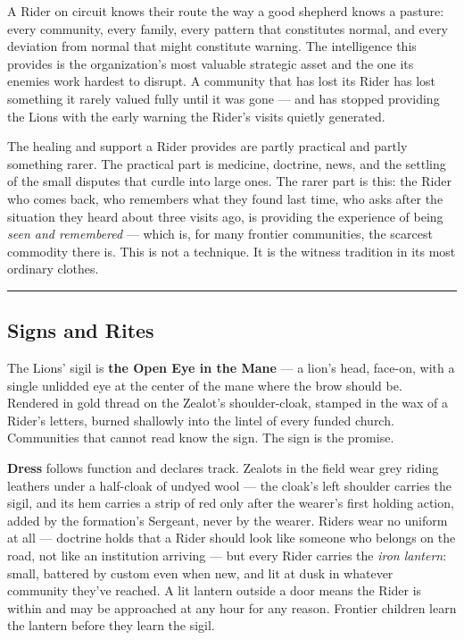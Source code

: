 A Rider on circuit knows their route the way a good shepherd knows a pasture: every community, every family, every pattern that constitutes normal, and every deviation from normal that might constitute warning. The intelligence this provides is the organization's most valuable strategic asset and the one its enemies work hardest to disrupt. A community that has lost its Rider has lost something it rarely valued fully until it was gone --- and has stopped providing the Lions with the early warning the Rider's visits quietly generated.

The healing and support a Rider provides are partly practical and partly something rarer. The practical part is medicine, doctrine, news, and the settling of the small disputes that curdle into large ones. The rarer part is this: the Rider who comes back, who remembers what they found last time, who asks after the situation they heard about three visits ago, is providing the experience of being \textit{seen and remembered} --- which is, for many frontier communities, the scarcest commodity there is. This is not a technique. It is the witness tradition in its most ordinary clothes.

\medskip\hrule\medskip

\subsection{Signs and Rites}

The Lions' sigil is \textbf{the Open Eye in the Mane} --- a lion's head, face-on, with a single unlidded eye at the center of the mane where the brow should be. Rendered in gold thread on the Zealot's shoulder-cloak, stamped in the wax of a Rider's letters, burned shallowly into the lintel of every funded church. Communities that cannot read know the sign. The sign is the promise.

\textbf{Dress} follows function and declares track. Zealots in the field wear grey riding leathers under a half-cloak of undyed wool --- the cloak's left shoulder carries the sigil, and its hem carries a strip of red only after the wearer's first holding action, added by the formation's Sergeant, never by the wearer. Riders wear no uniform at all --- doctrine holds that a Rider should look like someone who belongs on the road, not like an institution arriving --- but every Rider carries the \textit{iron lantern}: small, battered by custom even when new, and lit at dusk in whatever community they've reached. A lit lantern outside a door means the Rider is within and may be approached at any hour for any reason. Frontier children learn the lantern before they learn the sigil.

